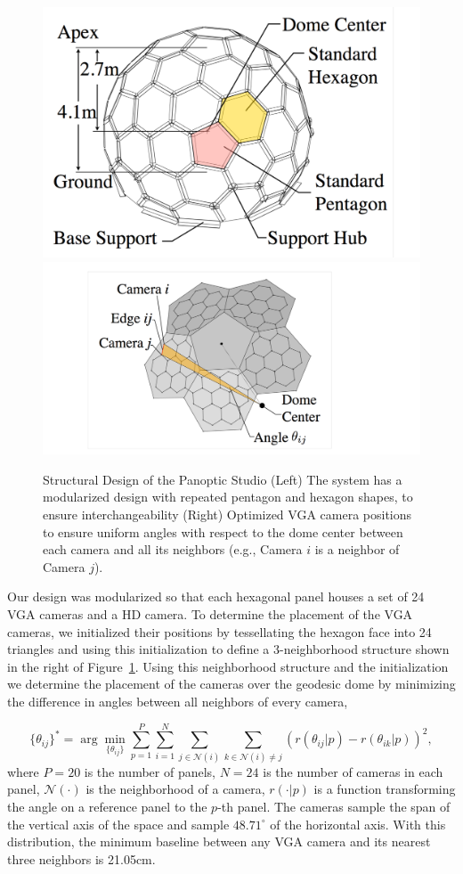 \begin{figure}
	\centering       
	\includegraphics[trim=0 0 100 0,clip,width=0.48\linewidth]{figures/DomeFigure2} 
	\includegraphics[trim=230 50 400 50,clip,width=0.48\linewidth]{figures/DomeFigure3}
	\caption{Structural Design of the Panoptic Studio (Left) The system has a modularized design with repeated pentagon and hexagon shapes, to ensure interchangeability (Right) Optimized VGA camera positions to ensure uniform angles with respect to the dome center between each camera and all its neighbors (e.g., Camera $i$ is a neighbor of Camera $j$).} 
	\label{fig:dome_structure}
\end{figure}


Our design was modularized so that each hexagonal panel houses a set of 24 VGA cameras and a HD camera. To determine the placement of the VGA cameras, we initialized their positions by tessellating the hexagon face into 24 triangles and using this initialization to define a 3-neighborhood structure shown in the right of Figure~\ref{fig:dome_structure}. Using this neighborhood structure and the initialization we determine the placement of the cameras over the geodesic dome by minimizing the difference in angles between all neighbors of every camera,

{\small
	\begin{equation}\nonumber
	\{\theta_{ij}\}^* = \arg \min_{\{\theta_{ij}\}} \sum_{p=1}^P \sum_{i=1}^{N} \sum_{j \in \mathcal{N}(i)}  \sum_{k \in \mathcal{N}(i) \neq j}  (r(\theta_{ij}|p)-r(\theta_{ik}|p))^2 ,
	\end{equation}
}where $P=20$ is the number of panels, $N=24$ is the number of cameras in each panel, $\mathcal{N}(\cdot)$ is the neighborhood of a camera, $r(\cdot|p)$ is a function transforming the angle on a reference panel to the $p$-th panel. The cameras sample the span of the vertical axis of the space and sample $48.71^\circ$ of the horizontal axis. With this distribution, the minimum baseline between any VGA camera and its nearest three neighbors is 21.05cm. 
	
